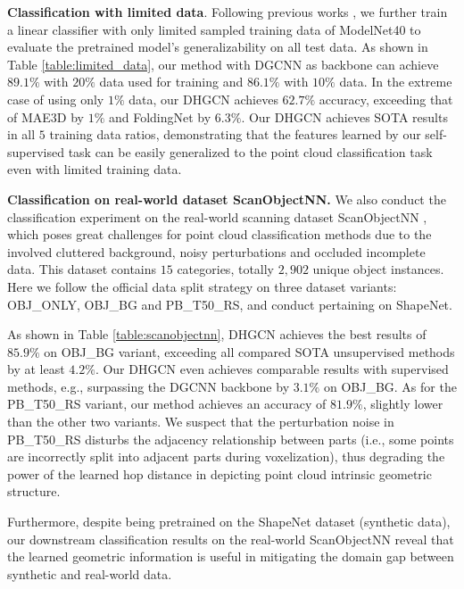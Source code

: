 \documentclass[letterpaper]{article}
\begin{document}
\textbf{Classification with limited data}.
Following previous works \cite{yang2018foldingnet}, we further train a linear classifier with only limited sampled training data of ModelNet40 to evaluate the pretrained model's generalizability on all test data.
As shown in Table \ref{table:limited_data}, our method with DGCNN as backbone can achieve $89.1\%$ with $20\%$ data used for training and $86.1\%$ with $10\%$ data.
In the extreme case of using only $1\%$ data, our DHGCN achieves $62.7\%$ accuracy, exceeding that of MAE3D by $1\%$ and FoldingNet by $6.3\%$.
Our DHGCN achieves SOTA results in all $5$ training data ratios, demonstrating that the  features learned by our self-supervised task can be easily generalized to the point cloud classification task even with limited training data.

\textbf{Classification on real-world dataset ScanObjectNN.}
We also conduct the classification experiment on the real-world scanning dataset ScanObjectNN \cite{uy2019revisiting}, which poses great challenges for point cloud classification methods due to the involved cluttered background, noisy perturbations and occluded incomplete data.
This dataset contains $15$ categories, totally $2,902$ unique object instances.
Here we follow the official data split strategy on three dataset variants: OBJ\_ONLY, OBJ\_BG and PB\_T50\_RS, and conduct pertaining on ShapeNet.


As shown in Table \ref{table:scanobjectnn}, DHGCN achieves the best results of \(85.9\%\) on OBJ\_BG variant, exceeding all compared SOTA unsupervised methods by at least $4.2\%$.
Our DHGCN even achieves comparable results with supervised methods, e.g., surpassing the DGCNN backbone by $3.1\%$ on OBJ\_BG.
As for the PB\_T50\_RS variant, our method achieves an accuracy of \(81.9\%\), slightly lower than the other two variants.
We suspect that the perturbation noise in PB\_T50\_RS disturbs the adjacency relationship between parts (i.e., some points are incorrectly split into adjacent parts during voxelization), thus degrading the power of the learned hop distance in depicting point cloud intrinsic geometric structure.

Furthermore, despite being pretrained on the ShapeNet dataset (synthetic data), our downstream classification results on the real-world ScanObjectNN reveal that the learned geometric information is useful in mitigating the domain gap between synthetic and real-world data.
\end{document}
